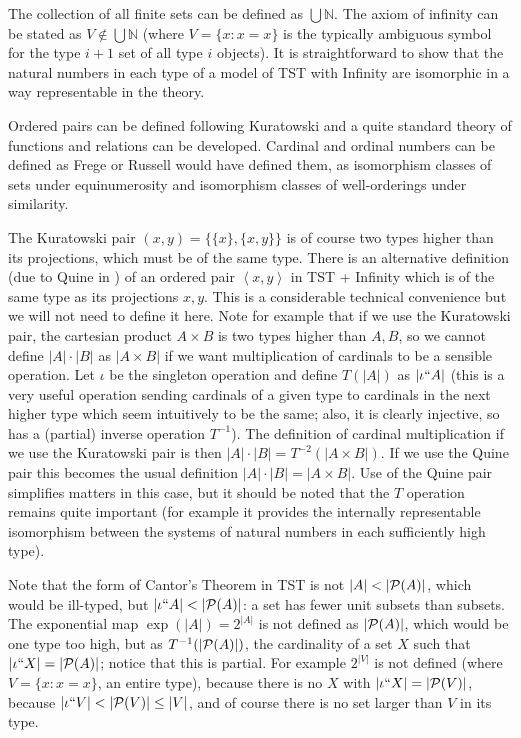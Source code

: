 \documentclass{article}
\theoremstyle{definition}
\theoremstyle{remark}
\begin{document}
{The collection of all finite sets can be defined as $\bigcup \mathbb N$.  The axiom of infinity can be stated as $V \not\in \bigcup \mathbb N$ (where $V= \{x:x=x\}$ is the typically ambiguous symbol for the type $i+1$ set of all type $i$ objects).  It is straightforward to show that the natural numbers in each type of a model of TST with Infinity are isomorphic in a way representable in the theory.

Ordered pairs can be defined following Kuratowski and a quite standard theory of functions and relations can be developed.  Cardinal and ordinal numbers can be defined as Frege or Russell would have defined them, as isomorphism classes of sets under equinumerosity and isomorphism classes of well-orderings under similarity.

The Kuratowski pair $(x,y) = \{\{x\},\{x,y\}\}$ is of course two types higher than its projections, which must be of the same type.  There is an alternative definition (due to Quine in \cite{quinepair}) of an ordered pair
$\left< x,y\right>$ in TST + Infinity which is of the same type as its projections $x,y$.  This is a considerable technical convenience but we will not need to define it here.  Note for example that if we use the Kuratowski pair, the cartesian product $A \times B$ is two types higher than $A,B$, so we cannot define $|A| \cdot |B|$ as $|A \times B|$ if we want multiplication of cardinals to be a sensible operation.  Let $\iota$ be the singleton operation and define $T(|A|)$ as $|\iota``A|$ (this is a very useful operation sending cardinals of a given type to cardinals in the next higher type which seem intuitively to be the same; also, it is clearly injective, so has a (partial) inverse operation $T^{-1}$).  The definition of cardinal multiplication if we use the Kuratowski pair is then $|A| \cdot |B| =T^{-2}(|A\times B|)$.  If we use the Quine pair this becomes the usual definition $|A| \cdot |B| =|A\times B|$.  Use of the Quine pair simplifies matters in this case, but it should be noted that the $T$ operation remains quite important (for example it provides the internally representable isomorphism between the systems of natural numbers in each sufficiently high type).

Note that the form of Cantor's Theorem in TST is not $|A| < |{\cal P}(A)|$, which would be ill-typed, but $|\iota``A|<|{\cal P}(A)|$:  a set has fewer unit subsets than subsets.  The exponential map $\exp(|A|) = 2^{|A|}$ is not defined as $|{\cal P}(A)|$, which would be one type too high, but as $T^{-1}(|{\cal P}(A)|)$, the cardinality of a set $X$ such that $|\iota``X| = |{\cal P}(A)|$;   notice that this is partial.  For example
$2^{|V|}$ is not defined (where $V=\{x:x=x\}$, an entire type), because there is no $X$ with $|\iota``X|=|{\cal P}(V)|$, because $|\iota``V|<|{\cal P}(V)| \leq |V|$, and of course there is no set larger than $V$ in its type.

}
\end{document}
